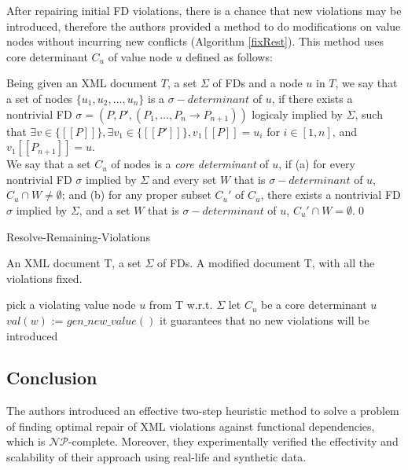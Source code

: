 After repairing initial FD violations, there is a chance that new violations may be introduced, therefore the authors provided a method to do modifications on value nodes without incurring new conflicts (Algorithm \ref{fixRest}). This method uses core determinant $C_u$ of value node $u$ defined as follows:

\begin{define}
Being given an XML document $T$, a set $\Sigma$ of FDs and a node $u$ in $T$, we say that a set of nodes $\{u_1, u_2, \dots, u_n\}$ is a $\sigma\!-\!determinant$ of $u$, if there exists a nontrivial FD $\sigma = (P, P', (P_1, \dots, P_n \rightarrow P_{n+1}))$ logicaly implied by $\Sigma$, such that $\exists v \in \{[\![P]\!]\}, \exists v_1 \in \{[\![P']\!]\}, v_1[\![P]\!] = u_i$ for $i \in [1,n]$, and $v_1[\![P_{n+1}]\!] = u$.\\
We say that a set $C_u$ of nodes is a {\sl core determinant} of $u$, if (a) for every nontrivial FD $\sigma$ implied by $\Sigma$ and every set $W$ that is $\sigma\!-\!determinant$ of $u$, $C_u \cap W \neq \emptyset$; and (b) for any proper subset $C_u'$ of $C_u$, there exists a nontrivial FD $\sigma$ implied by $\Sigma$, and a set $W$ that is $\sigma\!-\!determinant$ of $u$, $C_u' \cap W = \emptyset$.\qed
\end{define}

\begin{algorithm}
\caption{Resolve-Remaining-Violations}
\label{fixRest}
\begin{algorithmic}[1]
\REQUIRE An XML document T, a set $\Sigma$ of FDs.
\ENSURE A modified document T, with all the violations fixed.

\STATE pick a violating value node $u$ from T w.r.t. $\Sigma$
\STATE let $C_u$ be a core determinant $u$
\STATE $val(w)$ := $gen\_new\_value()$
\STATE \COMMENT it guarantees that no new violations will be introduced
\ENDFOR
\ENDWHILE
\end{algorithmic}
\end{algorithm}

\subsection{Conclusion}

The authors introduced an effective two-step heuristic method to solve a problem of finding optimal repair of XML violations against functional dependencies, which is $\mathcal{NP}$-complete. Moreover, they experimentally verified the effectivity and scalability of their approach using real-life and synthetic data.
